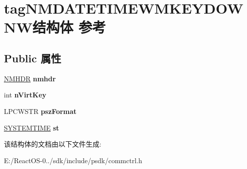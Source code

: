 \hypertarget{structtag_n_m_d_a_t_e_t_i_m_e_w_m_k_e_y_d_o_w_n_w}{}\section{tag\+N\+M\+D\+A\+T\+E\+T\+I\+M\+E\+W\+M\+K\+E\+Y\+D\+O\+W\+N\+W结构体 参考}
\label{structtag_n_m_d_a_t_e_t_i_m_e_w_m_k_e_y_d_o_w_n_w}
\subsection*{Public 属性}
\begin{DoxyCompactItemize}
\item 
\mbox{\label{structtag_n_m_d_a_t_e_t_i_m_e_w_m_k_e_y_d_o_w_n_w_a7b2c9c1987aa062af8dc44c83ab7a99f}} 
\hyperlink{structtag_n_m_h_d_r}{N\+M\+H\+DR} {\bfseries nmhdr}
\item 
\mbox{\label{structtag_n_m_d_a_t_e_t_i_m_e_w_m_k_e_y_d_o_w_n_w_a83cbc7dce7a3d5d6070ffd85762ba36f}} 
int {\bfseries n\+Virt\+Key}
\item 
\mbox{\label{structtag_n_m_d_a_t_e_t_i_m_e_w_m_k_e_y_d_o_w_n_w_a03af731793e3155da8ab26b22197adb9}} 
L\+P\+C\+W\+S\+TR {\bfseries psz\+Format}
\item 
\mbox{\label{structtag_n_m_d_a_t_e_t_i_m_e_w_m_k_e_y_d_o_w_n_w_a6e3de104bbe1f691b6a2889793bc58fd}} 
\hyperlink{struct___s_y_s_t_e_m_t_i_m_e}{S\+Y\+S\+T\+E\+M\+T\+I\+ME} {\bfseries st}
\end{DoxyCompactItemize}


该结构体的文档由以下文件生成\+:\begin{DoxyCompactItemize}
\item 
E\+:/\+React\+O\+S-\/0../sdk/include/psdk/commctrl.\+h\end{DoxyCompactItemize}
